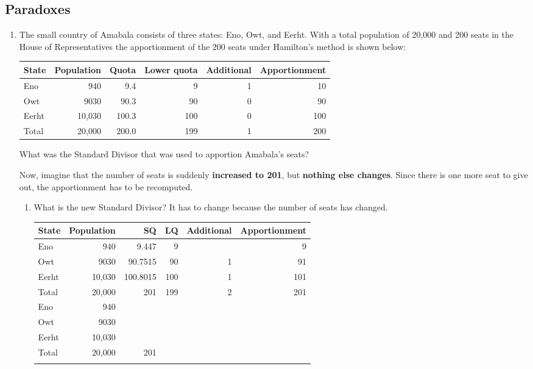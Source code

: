 \subsection{Paradoxes}  \label{sec:Paradoxes}
\begin{enumerate}
	\item The small country of Amabala consists of three states: Eno, Owt, and Eerht.  With a total population of 20,000 and 200 seats in the House of Representatives the apportionment of the 200 seats under Hamilton's method is shown below:

	\begin{center}
		\begin{tabular}{lrrrrr} \hline
	State & Population & Quota & Lower quota & Additional & Apportionment \\\hline
	Eno & 940 & 9.4 & 9 & 1 & 10 \\\hline
	Owt & 9030 & 90.3 & 90 & 0 & 90 \\\hline
	Eerht & 10,030 & 100.3 & 100 & 0 & 100 \\\hline\hline
	Total & 20,000 & 200.0 & 199 & 1 & 200 \\\hline
	\end{tabular}
	\end{center}
	What was the Standard Divisor that was used to apportion Amabala's seats?  \fi\hrulefill
	
	Now, imagine that the number of seats is suddenly \textbf{increased to 201}, but \textbf{nothing else changes}.  Since there is one more seat to give out, the apportionment has to be recomputed.
	\begin{enumerate}
		\item What is the new Standard Divisor?  It has to change because the number of seats has changed.   \fi \hrulefill
	
	\begin{center}
	\large
		\begin{tabular}{l|r|r|r|r|r} \hline
	State & Population & SQ & LQ & Additional & Apportionment \\\hline
	\ifsolns
	Eno  & 940 & 9.447 & 9 &  & 9\\\hline 
Owt  & 9030 & 90.7515 & 90 & 1 & 91\\\hline 
Eerht  & 10,030 & 100.8015 & 100 & 1 & 101 \\\hline \hline
Total  & 20,000 & 201 & 199 & 2 & 201 \\\hline 
\else
	Eno & 940 &  &  &  &  \\\hline
	Owt & 9030 &  &  &  &  \\\hline
	Eerht & 10,030 &  &  &  &  \\\hline \hline
	Total & 20,000 & 201 &  &  &  \\\hline \fi
	\end{tabular}
	\normalsize
	\end{center}
	

\end{enumerate}
\end{enumerate}
